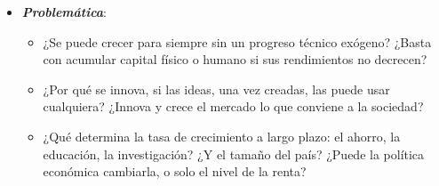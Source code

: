 \documentclass[11pt]{article}
\begin{document}
\begin{itemize}
\begin{itemize}
\begin{itemize}
  \item En los 70, con las crisis del petróleo, la atención se desplazó a los ciclos económicos, y dentro del crecimiento, a las teorías del desarrollo . La teoría renace a mediados de los 80~con \textcite{Romer1986Increasing} y \textcite{Lucas1988}\footnote{ recibió el Premio Nobel de Economía en 1995 «por haber desarrollado y aplicado la hipótesis de las expectativas racionales, transformando así el análisis macroeconómico y profundizando en nuestra comprensión de la política económica»\nocite{NobelPrize1995Lucas}.}; siguen \textcite{Barro1990}, \textcite{JonesManuelli1990} y \textcite{Rebelo1991Long}, y el salto a la innovación llega con \textcite{Romer1990}, \textcite{GrossmanHelpman1991} y \textcite{AghionHowitt1992}\nocite{Romer1994}. \textcite{Jones1995} abrió el debate de los efectos escala, que sigue vivo.
  \end{itemize}
  \end{itemize}

\item \textbf{\emph{Problemática}}:
  \begin{itemize}
  \item ¿Se puede crecer para siempre sin un progreso técnico exógeno? ¿Basta con acumular capital físico o humano si sus rendimientos no decrecen?
  \item ¿Por qué se innova, si las ideas, una vez creadas, las puede usar cualquiera? ¿Innova y crece el mercado lo que conviene a la sociedad?
  \item ¿Qué determina la tasa de crecimiento a largo plazo: el ahorro, la educación, la investigación? ¿Y el tamaño del país? ¿Puede la política económica cambiarla, o solo el nivel de la renta?
  \end{itemize}


\end{itemize}
\end{document}
